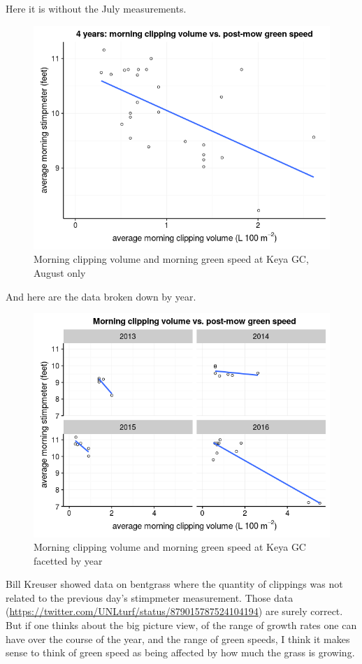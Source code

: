 \documentclass[12pt,b5,]{tufte-book}
\begin{document}
Here it is without the July measurements.

\begin{figure}
\centering
\includegraphics{img/b10-3.png}
\caption{Morning clipping volume and morning green speed at Keya GC, August only}
\end{figure}

And here are the data broken down by year.

\begin{figure}
\centering
\includegraphics{img/b10-4.png}
\caption{Morning clipping volume and morning green speed at Keya GC facetted by year}
\end{figure}

Bill Kreuser showed data on bentgrass where the quantity of clippings was not related to the previous day's stimpmeter measurement. Those data (\url{https://twitter.com/UNLturf/status/879015787524104194}) are surely correct. But if one thinks about the big picture view, of the range of growth rates one can have over the course of the year, and the range of green speeds, I think it makes sense to think of green speed as being affected by how much the grass is growing.
\end{document}
